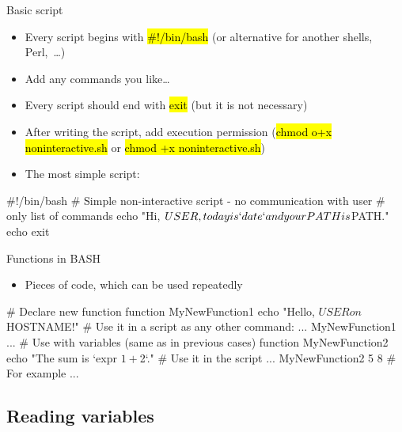 \documentclass[compress, ucs, xelatex, 11pt, xcolor=svgnames,
  hyperref={
    bookmarks=true,
    unicode=true,
    colorlinks=true,
    pdftitle={Linux, command line and MetaCentrum},
    plainpages=false,
    pdfauthor={Vojtech Zeisek},
    pdfsubject={Course about use of Linux command line, writing shell scripts and using MetaCentrum of CESNET},
    pdfcreator={XeLaTeX},
    pdfkeywords={Linux, GNU, BASH, shell, command line, MetaCentrum},
    linkcolor=Red,
    anchorcolor=Blue,
    citecolor=Purple,
    filecolor=DodgerBlue,
    menucolor=DarkOrchid,
    urlcolor=DeepSkyBlue,
    pdftex},
  url={hyphens, lowtilde} %
  ]{beamer}
\renewcommand{\texttt}[1]{\hl{\ttfamily #1}}
\begin{document}
\begin{frame}[fragile]{Basic script}
\begin{itemize}
 \item Every script begins with \texttt{\#!/bin/bash} (or alternative for another shells, Perl,~\ldots)
 \item Add any commands you like\ldots
 \item Every script should end with \texttt{exit} (but it is not necessary)
 \item After writing the script, add execution permission (\texttt{chmod o+x noninteractive.sh} or \texttt{chmod +x noninteractive.sh})
 \item The most simple script:
\end{itemize}
  \begin{bashcode}
    #!/bin/bash
    # Simple non-interactive script - no communication with user
    # only list of commands
    echo "Hi, $USER, today is `date` and your PATH is $PATH."
    echo
    exit
  \end{bashcode}
\end{frame}

\begin{frame}[fragile]{Functions in BASH}
  \begin{itemize}
    \item Pieces of code, which can be used repeatedly
  \end{itemize}
  \begin{bashcode}
    # Declare new function
    function MyNewFunction1 {
      echo "Hello, $USER on $HOSTNAME!"
      }
    # Use it in a script as any other command:
    ...
    MyNewFunction1
    ...
    # Use with variables (same as in previous cases)
    function MyNewFunction2 {
      echo "The sum is `expr $1 + $2`."
      }
    # Use it in the script
    ...
    MyNewFunction2 5 8 # For example
    ...
  \end{bashcode}
\end{frame}

\subsection{Reading variables}
\end{document}
